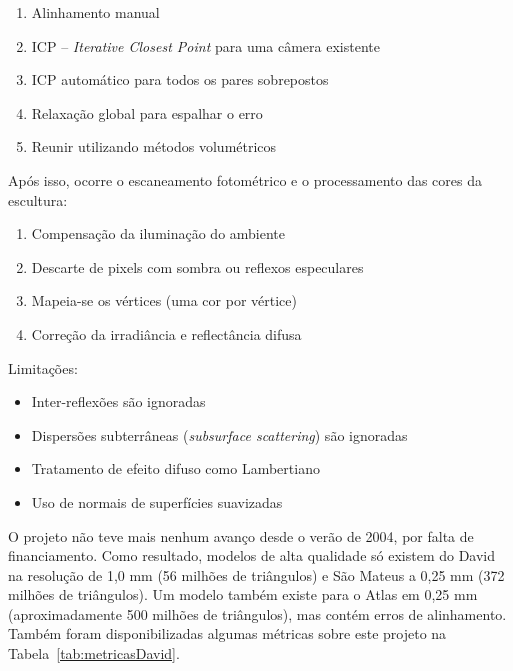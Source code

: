 \begin{enumerate}
\item{Alinhamento manual}
\item{ICP -- \emph{Iterative Closest Point} para uma câmera existente} %
\item{ICP automático para todos os pares sobrepostos}
\item{Relaxação global para espalhar o erro}
\item{Reunir utilizando métodos volumétricos}
\end{enumerate}
Após isso, ocorre o escaneamento fotométrico e o processamento das cores da escultura:
\begin{enumerate}
\item{Compensação da iluminação do ambiente}
\item{Descarte de pixels com sombra ou reflexos especulares}
\item{Mapeia-se os vértices (uma cor por vértice)}
\item{Correção da irradiância e reflectância difusa}
\end{enumerate}

Limitações:
\begin{itemize}
\item{Inter-reflexões são ignoradas}
\item{Dispersões subterrâneas (\emph{subsurface scattering}) são ignoradas}
\item{Tratamento de efeito difuso como Lambertiano} %
\item{Uso de normais de superfícies suavizadas}
\end{itemize}

O projeto não teve mais nenhum avanço desde o verão de 2004, por falta de
financiamento. Como resultado, modelos de alta qualidade só existem do David na
resolução de 1,0 mm (56 milhões de triângulos) e São Mateus a 0,25 mm (372
milhões de triângulos). Um modelo também existe para o Atlas em 0,25 mm
(aproximadamente 500 milhões de triângulos), mas contém erros de alinhamento.
Também foram disponibilizadas algumas métricas sobre este projeto na Tabela~\ref{tab:metricasDavid}.

